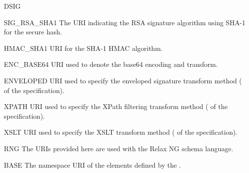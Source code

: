 \documentclass{howto}
\begin{document}
\begin{classdesc*}{DSIG}
  \begin{memberdesc}{SIG_RSA_SHA1}
    The URI indicating the RSA signature algorithm using SHA-1 for the
    secure hash.
  \end{memberdesc}

  \begin{memberdesc}{HMAC_SHA1}
    URI for the SHA-1 HMAC algorithm.
  \end{memberdesc}

  \begin{memberdesc}{ENC_BASE64}
    URI used to denote the base64 encoding and transform.
  \end{memberdesc}

  \begin{memberdesc}{ENVELOPED}
    URI used to specify the enveloped signature transform method
    (
    of the specification).
  \end{memberdesc}

  \begin{memberdesc}{XPATH}
    URI used to specify the XPath filtering transform method
    ( of the
    specification).
  \end{memberdesc}

  \begin{memberdesc}{XSLT}
    URI used to specify the XSLT transform method ( of the
    specification).
  \end{memberdesc}
\end{classdesc*}


\begin{classdesc*}{RNG}
  The URIs provided here are used with the Relax NG schema language.

  \begin{memberdesc}{BASE}
   The namespace URI of the elements defined by the
   .
  \end{memberdesc}
\end{classdesc*}
\end{document}
